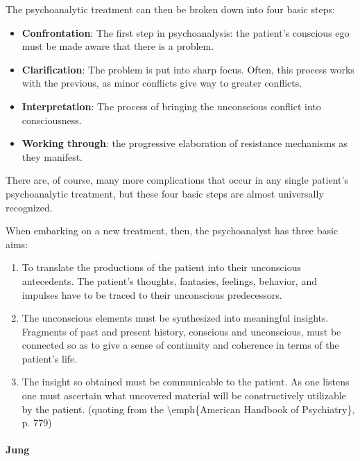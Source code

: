 \begin{refsection}
The psychoanalytic treatment can then be broken down into four basic steps:

\begin{itemize}
\item \textbf{Confrontation}: The first step in psychoanalysis: the patient's conscious ego must be made aware that there is a problem. 

\item \textbf{Clarification}: The problem is put into sharp focus. Often, this process works with the previous, as minor conflicts give way to greater conflicts.

\item \textbf{Interpretation}: The process of bringing the unconscious conflict into consciousness.

\item \textbf{Working through}: the progressive elaboration of resistance mechanisms as they manifest.

\end{itemize}

There are, of course, many more complications that occur in any single patient's psychoanalytic treatment, but these four basic steps are almost universally recognized.

When embarking on a new treatment, then, the psychoanalyst has three basic aims:

\begin{enumerate}
\item To translate the productions of the patient into their unconscious antecedents. The patient's thoughts, fantasies, feelings, behavior, and impulses have to be traced to their unconscious predecessors.

\item The unconscious elements must be synthesized into meaningful insights. Fragments of past and present history, conscious and unconscious, must be connected so as to give a sense of continuity and coherence in terms of the patient's life.

\item The insight so obtained must be communicable to the patient. As one listens one must ascertain what uncovered material will be constructively utilizable by the patient. (quoting from the \textbackslash{}emph\{American Handbook of Psychiatry\}, p. 779)

\end{enumerate}

\paragraph{Jung}
\label{jung}


\end{refsection}
